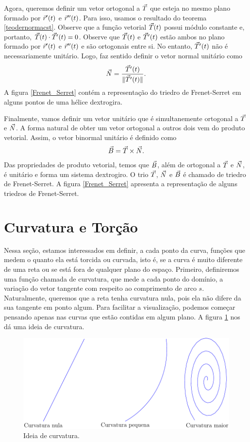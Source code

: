 Agora, queremos definir um vetor ortogonal a $\vec{T}$ que esteja no mesmo plano formado por $\vec{r}'(t)$ e $\vec{r}''(t)$. Para isso, usamos o resultado do teorema \ref{teodernormacst}. Observe que a função vetorial $\vec{T}(t)$ possui módulo constante e, portanto, $\vec{T}(t)\cdot \vec{T}'(t)=0$. Observe que $\vec{T}(t)$ e $\vec{T}'(t)$ estão ambos no plano formado por $\vec{r}'(t)$ e $\vec{r}''(t)$ e são ortogonais entre si. No entanto, $\vec{T}'(t)$ não é necessariamente unitário. Logo, faz sentido definir o vetor normal unitário como
$$
\vec{N}=\frac{\vec{T}'(t)}{\|\vec{T}'(t)\|}.
$$
A figura \ref{Frenet_Serret} contém a representação do triedro de Frenet-Serret em alguns pontos de uma hélice dextrogira.

Finalmente, vamos definir um vetor unitário que é simultanemente ortogonal a $\vec{T}$ e $\vec{N}$. A forma natural de obter um vetor ortogonal a outros dois vem do produto vetorial. Assim, o vetor binormal unitário é definido como
$$
\vec{B}=\vec{T}\times\vec{N}.
$$
Das propriedades de produto vetorial, temos que $\vec{B}$, além de ortogonal a $\vec{T}$ e $\vec{N}$, é unitário e forma um sistema dextrogiro. O trio $\vec{T}$, $\vec{N}$ e $\vec{B}$ é chamado de triedro de Frenet-Serret. A figura \ref{Frenet_Serret} apresenta a representação de alguns triedros de Frenet-Serret.


\section{Curvatura e Torção}

Nessa seção, estamos interessados em definir, a cada ponto da curva, funções que medem o quanto ela está torcida ou curvada, isto é, se a curva é muito diferente de uma reta ou se está fora de qualquer plano do espaço. Primeiro, definiremos uma função chamada de curvatura, que mede a cada ponto do domínio, a variação do vetor tangente com respeito ao comprimento de arco $s$. Naturalmente, queremos que a reta tenha curvatura nula, pois ela não difere da sua tangente em ponto algum. Para facilitar a visualização, podemos começar pensando apenas nas curvas que estão contidas em algum plano. A figura \ref{curvatura} nos dá uma ideia de curvatura.


\begin{figure}
\begin{center}
    \includegraphics{./cap_curvas/pics/exemplos_de_curvatura}
 \caption{Ideia de curvatura.\label{curvatura}}
  \end{center}
\end{figure}
 
